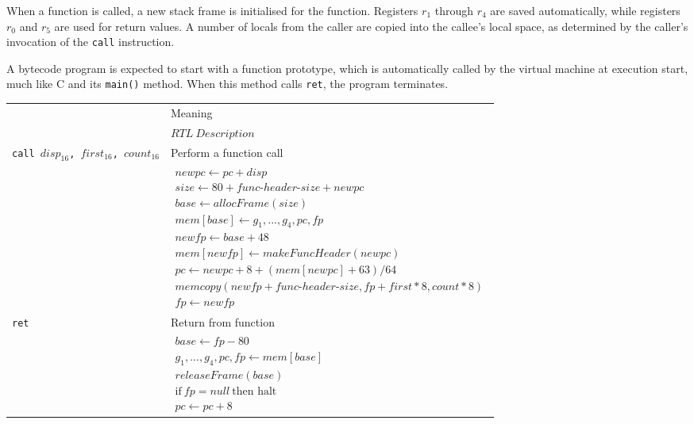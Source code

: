 		When a function is called, a new stack frame is initialised for the function. Registers $r_1$ through $r_4$ are saved automatically, while registers $r_0$ and $r_5$ are used for return values. A number of locals from the caller are copied into the callee's local space, as determined by the caller's invocation of the \texttt{call} instruction.
		
		A bytecode program is expected to start with a function prototype, which is automatically called by the virtual machine at execution start, much like C and its \texttt{main()} method. When this method calls \texttt{ret}, the program terminates.
		
		\begin{longtable}{|p{10em}|p{30em}|}
			\hline \endfoot
			\hline 
			\multirow{2}{*}{Instruction} & Meaning \\*
			& $RTL~Description$ \\
			\hline \endhead
			\texttt{call $disp_{16}$, $first_{16}$, $count_{16}$} & Perform a function call \\*
			& $\begin{array}{lcl}
			newpc \leftarrow pc + disp \\
			size \leftarrow 80 + func\mbox{-}header\mbox{-}size + newpc \\
			base \leftarrow allocFrame(size) \\
			mem[base] \leftarrow g_1,...,g_4,pc,fp \\
			newfp \leftarrow base + 48 \\
			mem[newfp] \leftarrow makeFuncHeader(newpc) \\
			pc \leftarrow newpc + 8 + (mem[newpc] + 63)/64 \\
			memcopy(newfp + func\mbox{-}header\mbox{-}size, fp + first*8, count*8) \\
			fp \leftarrow newfp
			\end{array}$ \\
			\hline
			\texttt{ret} & Return from function \\*
			& $\begin{array}{lcl}
			base \leftarrow fp - 80 \\
			g_1,...,g_4,pc,fp \leftarrow mem[base] \\
			releaseFrame(base) \\
			\mbox{if}~ fp = null ~\mbox{then halt} \\
			pc \leftarrow pc + 8
			\end{array}$ \\
			\hline
		\end{longtable}
		
